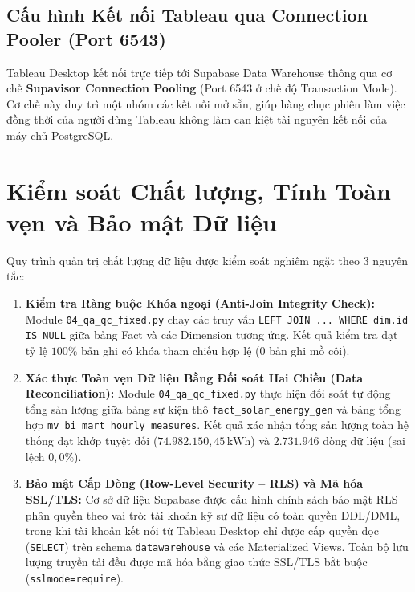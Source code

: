 \documentclass[12pt, a4paper]{report}
\begin{document}
\subsection{Cấu hình Kết nối Tableau qua Connection Pooler (Port 6543)}

Tableau Desktop kết nối trực tiếp tới Supabase Data Warehouse thông qua cơ chế \textbf{Supavisor Connection Pooling} (Port 6543 ở chế độ Transaction Mode). Cơ chế này duy trì một nhóm các kết nối mở sẵn, giúp hàng chục phiên làm việc đồng thời của người dùng Tableau không làm cạn kiệt tài nguyên kết nối của máy chủ PostgreSQL.

\section{Kiểm soát Chất lượng, Tính Toàn vẹn và Bảo mật Dữ liệu}
\label{sec:qa_qc_security}

Quy trình quản trị chất lượng dữ liệu được kiểm soát nghiêm ngặt theo 3 nguyên tắc:

\begin{enumerate}[label=\textbf{\arabic*.}, leftmargin=*]
    \item \textbf{Kiểm tra Ràng buộc Khóa ngoại (Anti-Join Integrity Check):}
    Module \texttt{04\_qa\_qc\_fixed.py} chạy các truy vấn \texttt{LEFT JOIN ... WHERE dim.id IS NULL} giữa bảng Fact và các Dimension tương ứng. Kết quả kiểm tra đạt tỷ lệ $100\%$ bản ghi có khóa tham chiếu hợp lệ (0 bản ghi mồ côi).

    \item \textbf{Xác thực Toàn vẹn Dữ liệu Bằng Đối soát Hai Chiều (Data Reconciliation):}
    Module \texttt{04\_qa\_qc\_fixed.py} thực hiện đối soát tự động tổng sản lượng giữa bảng sự kiện thô \texttt{fact\_solar\_energy\_gen} và bảng tổng hợp \texttt{mv\_bi\_mart\_hourly\_measures}. Kết quả xác nhận tổng sản lượng toàn hệ thống đạt khớp tuyệt đối ($74.982.150{,}45\,\text{kWh}$) và $2.731.946$ dòng dữ liệu (sai lệch $0{,}0\%$).

    \item \textbf{Bảo mật Cấp Dòng (Row-Level Security -- RLS) và Mã hóa SSL/TLS:}
    Cơ sở dữ liệu Supabase được cấu hình chính sách bảo mật RLS phân quyền theo vai trò: tài khoản kỹ sư dữ liệu có toàn quyền DDL/DML, trong khi tài khoản kết nối từ Tableau Desktop chỉ được cấp quyền đọc (\texttt{SELECT}) trên schema \texttt{datawarehouse} và các Materialized Views. Toàn bộ lưu lượng truyền tải đều được mã hóa bằng giao thức SSL/TLS bắt buộc (\texttt{sslmode=require}).
\end{enumerate}
\end{document}
